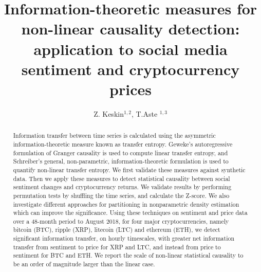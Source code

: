 \documentclass[]{rsos}%
\begin{document}
\title{Information-theoretic measures for non-linear causality detection: \\ application to social media sentiment and cryptocurrency prices}

\author{%
Z. Keskin$^{1,2}$, T.Aste $^{1,3}$}

\address{$^{1}$Department of Computer Science \& Centre for Blockchain Technologies, University College London, Gower Street, WC1E 6EA, London, United Kingdom.\\
$^{2}$Department of Physics and Astronomy, University College London, Gower Street, WC1E 6EA, London, United Kingdom.
$^3$ UCL Centre for Blockchain Technologies, University College London, London, United Kingdom.}

\subject{Information Theory, Causality, Computational Statistics, Time Series Analysis}
 


\begin{abstract}
    Information transfer between time series is calculated using the asymmetric information-theoretic measure known as transfer entropy. Geweke's autoregressive formulation of Granger causality is used to compute linear transfer entropy, and Schreiber's general, non-parametric, information-theoretic formulation is used to quantify non-linear transfer entropy. 
    We first validate these measures against synthetic data. Then we apply these measures to detect statistical causality between  social sentiment changes and cryptocurrency returns. We validate results by performing permutation tests by shuffling the time series, and calculate the Z-score. We also investigate different approaches for partitioning in nonparametric density estimation which can improve the significance. 
    Using these techniques on sentiment and price data over a 48-month period to August 2018, for four major cryptocurrencies, namely bitcoin (BTC), ripple (XRP), litecoin (LTC) and ethereum (ETH), we detect significant information transfer, on hourly timescales, with greater net information transfer from sentiment to price for XRP and LTC, and instead from price to sentiment for BTC and ETH. We report the scale of non-linear statistical causality to be an order of magnitude larger than the linear case.
\end{abstract}
\end{document}
